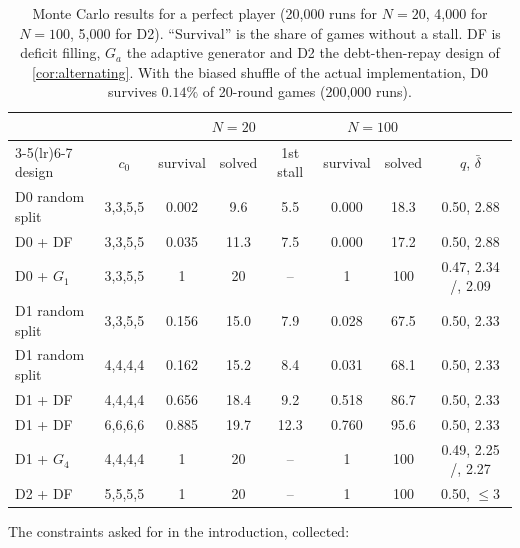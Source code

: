 \documentclass[11pt,a4paper]{article}
\theoremstyle{definition}
\theoremstyle{remark}
\begin{document}
\begin{table}[t]\centering\small
\caption{Monte Carlo results for a perfect player (20{,}000 runs for $N=20$, 4{,}000
for $N=100$, 5{,}000 for D2). ``Survival'' is the share of games without a stall. DF is
deficit filling, $G_a$ the adaptive generator and D2 the debt-then-repay design of
\cref{cor:alternating}. With the biased shuffle of the actual implementation, D0
survives $0.14\%$ of 20-round games (200{,}000 runs).}\label{tab:sim}
\begin{tabular}{lccccccc}
\toprule
& & \multicolumn{3}{c}{$N=20$} & \multicolumn{2}{c}{$N=100$} & \\
\cmidrule(lr){3-5}\cmidrule(lr){6-7}
design & $c_0$ & survival & solved & 1st stall & survival & solved & $q$, $\bar\delta$\\
\midrule
D0 random split      & 3,3,5,5 & 0.002 & 9.6  & 5.5  & 0.000 & 18.3 & 0.50, 2.88\\
D0 + DF              & 3,3,5,5 & 0.035 & 11.3 & 7.5  & 0.000 & 17.2 & 0.50, 2.88\\
D0 + $G_1$           & 3,3,5,5 & 1     & 20   & --   & 1     & 100  & 0.47, 2.34 \;/\; 0.44, 2.09\\
D1 random split      & 3,3,5,5 & 0.156 & 15.0 & 7.9  & 0.028 & 67.5 & 0.50, 2.33\\
D1 random split      & 4,4,4,4 & 0.162 & 15.2 & 8.4  & 0.031 & 68.1 & 0.50, 2.33\\
D1 + DF              & 4,4,4,4 & 0.656 & 18.4 & 9.2  & 0.518 & 86.7 & 0.50, 2.33\\
D1 + DF              & 6,6,6,6 & 0.885 & 19.7 & 12.3 & 0.760 & 95.6 & 0.50, 2.33\\
D1 + $G_4$           & 4,4,4,4 & 1     & 20   & --   & 1     & 100  & 0.49, 2.25 \;/\; 0.50, 2.27\\
D2 + DF              & 5,5,5,5 & 1     & 20   & --   & 1     & 100  & 0.50, $\le3$\\
\bottomrule
\end{tabular}
\end{table}

The constraints asked for in the introduction, collected:
\end{document}
